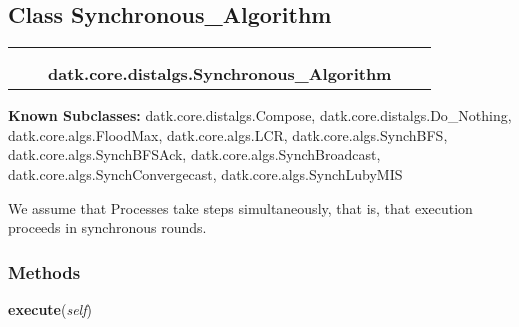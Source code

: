 \subsection{Class Synchronous\_Algorithm}

    \label{datk:core:distalgs:Synchronous_Algorithm}
\begin{tabular}{cccccc}
\multicolumn{2}{r}{\settowidth{\BCL}{datk.core.distalgs.Algorithm}\multirow{2}{\BCL}{datk.core.distalgs.Algorithm}}
&&
  \\\cline{3-3}
  &&\multicolumn{1}{c|}{}
&&
  \\
&&\multicolumn{2}{l}{\textbf{datk.core.distalgs.Synchronous\_Algorithm}}
\end{tabular}

\textbf{Known Subclasses:}
datk.core.distalgs.Compose,
    datk.core.distalgs.Do\_Nothing,
    datk.core.algs.FloodMax,
    datk.core.algs.LCR,
    datk.core.algs.SynchBFS,
    datk.core.algs.SynchBFSAck,
    datk.core.algs.SynchBroadcast,
    datk.core.algs.SynchConvergecast,
    datk.core.algs.SynchLubyMIS

We assume that Processes take steps simultaneously, that is, that execution
proceeds in synchronous rounds.



  \subsubsection{Methods}

    \label{datk:core:distalgs:Synchronous_Algorithm:execute}

    \vspace{0.5ex}

\hspace{.8\funcindent}\begin{boxedminipage}{\funcwidth}

    \raggedright \textbf{execute}(\textit{self})

\setlength{\parskip}{2ex}
\setlength{\parskip}{1ex}
    \end{boxedminipage}


